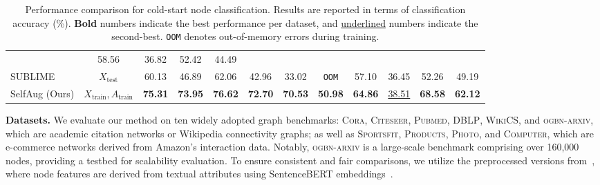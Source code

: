 \documentclass[letterpaper]{article} \usepackage{aaai2026}  \usepackage{times}  \usepackage{helvet}  \usepackage{courier}  \usepackage[hyphens]{url}  \usepackage{graphicx} \urlstyle{rm} \def\UrlFont{\rm}  \usepackage{natbib}  \usepackage{caption} \frenchspacing  \setlength{\pdfpagewidth}{8.5in}  \setlength{\pdfpageheight}{11in}
\begin{document}
\begin{table}[t]
{\begin{tabular}{l c c c c c c c c c c c}
        & 58.56
        & 36.82
        & 52.42
        & 44.49\\
SUBLIME & $X_\text{test}$
        & 60.13
        & 46.89
        & 62.06
        & 42.96
        & 33.02
        & \texttt{OOM}
        & 57.10
        & 36.45
        & 52.26
        & 49.19\\
\midrule
SelfAug (Ours) & $X_\text{train}, A_\text{train}$
& \textbf{75.31}
& \textbf{73.95}
& \textbf{76.62}
& \textbf{72.70}
& \textbf{70.53}
& \textbf{50.98}
& \textbf{64.86}
& \underline{38.51}
& \textbf{68.58}
& \textbf{62.12} \\
\bottomrule
\end{tabular}}
\caption{Performance comparison for cold-start node classification. Results are reported in terms of classification accuracy (\%). \textbf{Bold} numbers indicate the best performance per dataset, and \underline{underlined} numbers indicate the second-best. \texttt{OOM} denotes out-of-memory errors during training.}
\label{tab:performance_comparison_cold_start}
\end{table}

\textbf{Datasets.} We evaluate our method on ten widely adopted graph benchmarks: \textsc{Cora}, \textsc{Citeseer}, \textsc{Pubmed}, \textsc{DBLP}, \textsc{WikiCS}, and \textsc{ogbn-arxiv}, which are academic citation networks or Wikipedia connectivity graphs; as well as \textsc{Sportsfit}, \textsc{Products}, \textsc{Photo}, and \textsc{Computer}, which are e-commerce networks derived from Amazon's interaction data. Notably, \textsc{ogbn-arxiv} is a large-scale benchmark comprising over 160,000 nodes, providing a testbed for scalability evaluation. To ensure consistent and fair comparisons, we utilize the preprocessed versions from~\cite{chen2024exploring}, where node features are derived from textual attributes using SentenceBERT embeddings~\cite{thakur-2020-AugSBERT}.
\end{document}
